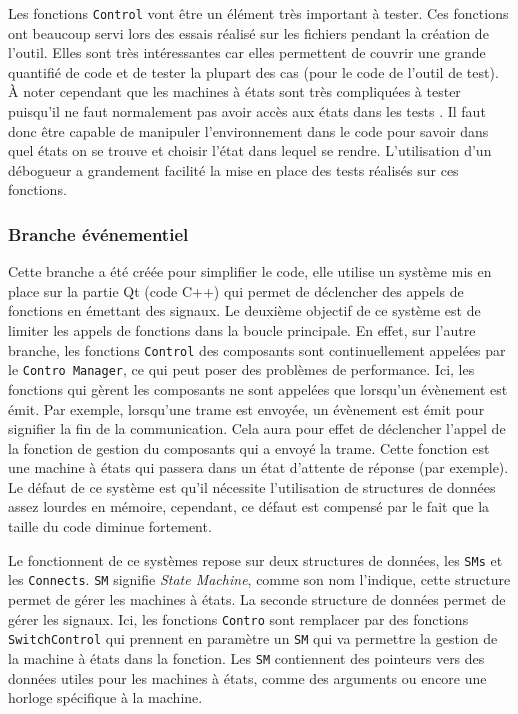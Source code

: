 \documentclass[a4paper]{article}
\begin{document}
Les fonctions \verb|Control| vont être un élément très important à tester. Ces
fonctions ont beaucoup servi lors des essais réalisé sur les fichiers pendant la
création de l'outil. Elles sont très intéressantes car elles permettent de
couvrir une grande quantifié de code et de tester la plupart des cas (pour le
code de l'outil de test). À noter cependant que les machines à états sont très
compliquées à tester puisqu'il ne faut normalement pas avoir accès aux états
dans les tests \cite{teststatemachines}. Il faut donc être capable de manipuler
l'environnement dans le code pour savoir dans quel états on se trouve et choisir
l'état dans lequel se rendre. L'utilisation d'un débogueur a grandement facilité
la mise en place des tests réalisés sur ces fonctions.

\subsubsection{Branche événementiel}
\label{brancheevent}

Cette branche a été créée pour simplifier le code, elle utilise un système mis
en place sur la partie Qt (code C++) qui  permet de déclencher des appels de
fonctions en émettant des signaux. Le deuxième objectif de ce système est de
limiter les appels de fonctions dans la boucle principale. En effet, sur l'autre
branche, les fonctions \verb|Control| des composants sont continuellement
appelées par le \verb|Contro Manager|, ce qui peut poser des problèmes de
performance. Ici, les fonctions qui gèrent les composants ne sont appelées que
lorsqu'un évènement est émit. Par exemple, lorsqu'une trame est envoyée, un
évènement est émit pour signifier la fin de la communication. Cela aura pour
effet de déclencher l'appel de la fonction de gestion du composants qui a envoyé
la trame. Cette fonction est une machine à états qui passera dans un état
d'attente de réponse (par exemple). Le défaut de ce système est qu'il nécessite
l'utilisation de structures de données assez lourdes en mémoire, cependant, ce
défaut est compensé par le fait que la taille du code diminue fortement.

Le fonctionnent de ce systèmes repose sur deux structures de données, les
\verb|SMs| et les \verb|Connects|. \verb|SM| signifie \textit{State Machine},
comme son nom l'indique, cette structure permet de gérer les machines à états.
La seconde structure de données permet de gérer les signaux. Ici, les fonctions
\verb|Contro| sont remplacer par des fonctions \verb|SwitchControl| qui prennent
en paramètre un \verb|SM| qui va permettre la gestion de la machine à états dans
la fonction. Les \verb|SM| contiennent des pointeurs vers des données utiles
pour les machines à états, comme des arguments ou encore une horloge spécifique
à la machine.
\end{document}
